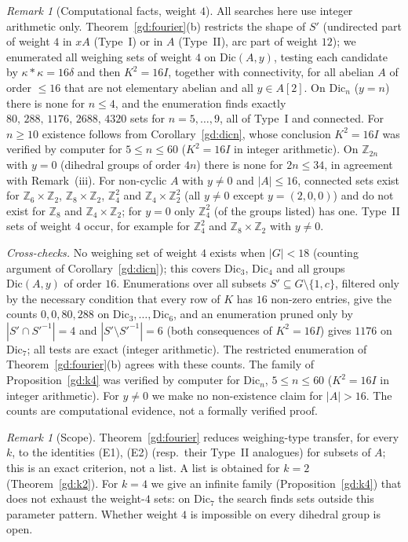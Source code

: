 \documentclass[preprint,11pt]{elsarticle}
\makeatletter
\theoremstyle{definition}
\theoremstyle{remark}
\newtheorem{remark}[theorem]{Remark}
\newcommand{\Z}{\mathbb Z}
\newcommand{\SR}[1]{\@nameuse{SR@#1}}
\makeatother
\begin{document}
\begin{remark}[Computational facts, weight $4$]
All searches here use integer arithmetic only. Theorem~\ref{gd:fourier}(b) restricts the shape of $S'$ (undirected part of weight $4$ in $xA$ (Type~I) or in $A$ (Type~II), arc part of weight $12$); we enumerated all weighing sets of weight $4$ on $\mathrm{Dic}(A,y)$, testing each candidate by $\kappa*\kappa=16\delta$ and then $K^2=16I$, together with connectivity, for all abelian $A$ of order $\le16$ that are not elementary abelian and all $y\in A[2]$. On $\mathrm{Dic}_n$ ($y=n$) there is none for $n\le4$, and the enumeration finds exactly $80,\,288,\,1176,\,2688,\,4320$ sets for $n=5,\dots,9$, all of Type~I and connected. For $n\ge10$ existence follows from Corollary~\ref{gd:dicn}, whose conclusion $K^2=16I$ was verified by computer for $5\le n\le60$ ($K^2=16I$ in integer arithmetic). On $\Z_{2n}$ with $y=0$ (dihedral groups of order $4n$) there is none for $2n\le34$, in agreement with Remark~\SR{rem:kgen}(iii). For non-cyclic $A$ with $y\ne0$ and $|A|\le16$, connected sets exist for $\Z_6\times\Z_2$, $\Z_8\times\Z_2$, $\Z_4^2$ and $\Z_4\times\Z_2^2$ (all $y\ne0$ except $y=(2,0,0)$) and do not exist for $\Z_8$ and $\Z_4\times\Z_2$; for $y=0$ only $\Z_4^2$ (of the groups listed) has one. Type~II sets of weight $4$ occur, for example for $\Z_4^2$ and $\Z_8\times\Z_2$ with $y\ne0$.

\emph{Cross-checks.} No weighing set of weight $4$ exists when $|G|<18$ (counting argument of Corollary~\ref{gd:dicn}); this covers $\mathrm{Dic}_3$, $\mathrm{Dic}_4$ and all groups $\mathrm{Dic}(A,y)$ of order $16$. Enumerations over all subsets $S'\subseteq G\setminus\{1,c\}$, filtered only by the necessary condition that every row of $K$ has $16$ non-zero entries, give the counts $0,0,80,288$ on $\mathrm{Dic}_3,\dots,\mathrm{Dic}_6$, and an enumeration pruned only by $|S'\cap S'^{-1}|=4$ and $|S'\setminus S'^{-1}|=6$ (both consequences of $K^2=16I$) gives $1176$ on $\mathrm{Dic}_7$; all tests are exact (integer arithmetic). The restricted enumeration of Theorem~\ref{gd:fourier}(b) agrees with these counts. The family of Proposition~\ref{gd:k4} was verified by computer for $\mathrm{Dic}_n$, $5\le n\le60$ ($K^2=16I$ in integer arithmetic). For $y\ne0$ we make no non-existence claim for $|A|>16$. The counts are computational evidence, not a formally verified proof.
\end{remark}

\begin{remark}[Scope]
Theorem~\ref{gd:fourier} reduces weighing-type transfer, for every $k$, to the identities (E1), (E2) (resp.\ their Type~II analogues) for subsets of $A$; this is an exact criterion, not a list. A list is obtained for $k=2$ (Theorem~\ref{gd:k2}). For $k=4$ we give an infinite family (Proposition~\ref{gd:k4}) that does not exhaust the weight-$4$ sets: on $\mathrm{Dic}_7$ the search finds sets outside this parameter pattern. Whether weight $4$ is impossible on every dihedral group is open.
\end{remark}
\end{document}
